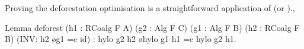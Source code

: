 \documentclass{llncs}
\begin{document}

Proving the deforestation optimisation is a straightforward application
of  (or ).,
\begin{coqcode}
Lemma deforest (h1 : RCoalg F A) (g2 : Alg F C)
  (g1 : Alg F B) (h2 : RCoalg F B) (INV: h2 \o g1 =e id)
  : hylo g2 h2 \o hylo g1 h1 =e hylo g2 h1.
\end{coqcode}
\end{document}
